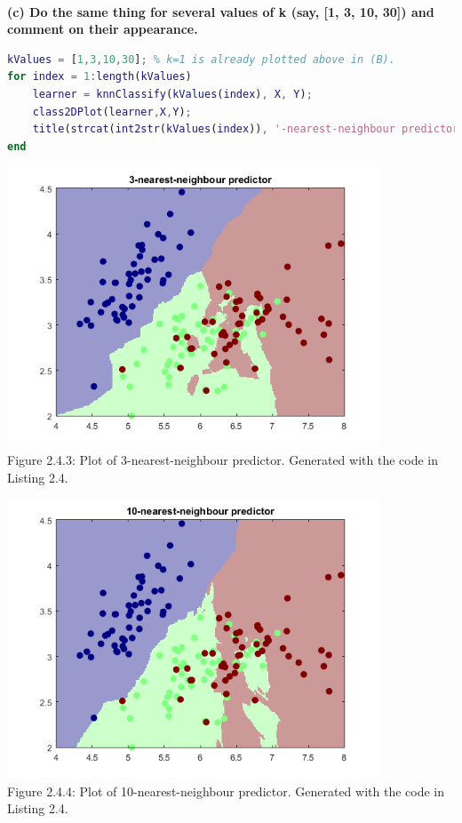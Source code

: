\documentclass[]{report}   %
\begin{document}
~\\
{\bf (c) Do the same thing for several values of k (say, [1, 3, 10, 30]) and comment on their appearance.}
\begin{lstlisting}[language=Matlab, caption=Teaching k-nearest-neighbour predictor for multiple values of k. {\bf Note:} figure for 1-nearest-neighbour predictor is above in part (b).]
kValues = [1,3,10,30]; % k=1 is already plotted above in (B).
for index = 1:length(kValues)
    learner = knnClassify(kValues(index), X, Y);
    class2DPlot(learner,X,Y);
    title(strcat(int2str(kValues(index)), '-nearest-neighbour predictor'));
end
\end{lstlisting}
\begin{center}
	\includegraphics[width=30em,keepaspectratio]{2_4_Figure_3.png}\\
	{Figure 2.4.3: Plot of 3-nearest-neighbour predictor. Generated with the code in Listing 2.4.}
\end{center} 
\begin{center}
	\includegraphics[width=30em,keepaspectratio]{2_4_Figure_4.png}\\
	{Figure 2.4.4: Plot of 10-nearest-neighbour predictor. Generated with the code in Listing 2.4.}
\end{center} 
\end{document}
